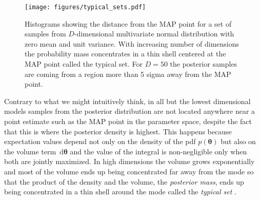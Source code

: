 \documentclass[12pt,dvipsnames]{report}
\newcommand{\ud}{\,\mathrm{d}}
\renewcommand{\vec}[1]{\boldsymbol{\mathbf{#1}}}
\begin{document}
%
\begin{figure}[t]
    \begin{centering}
        \texttt{[image: figures/typical\_sets.pdf]}
        \caption{Histograms showing the distance from the MAP point for a set of 
        samples from $D$-dimensional multivariate normal distribution with 
        zero mean and unit variance. With increasing number of dimensions the 
        probability mass concentrates in a thin shell centered at the MAP point 
        called the typical set. For $D=50$ the posterior samples are coming from 
        a region more than 5 sigma away from the MAP point.}     
               \label{fig:typical_sets}
    \end{centering}
\end{figure}
Contrary to what we might intuitively think, in all but the lowest dimensional models
samples from the posterior distribution are not located anywhere 
near a point estimate such as the MAP point in the parameter space, despite the fact 
that this is where the posterior density is highest.
This happens because expectation values  depend not only on the density of the pdf 
$p(\vec\theta)$ but also on the volume term 
$\ud \vec\theta$ and the value of the integral is non-negligible only when both are 
jointly maximized. In high dimensions the volume grows exponentially and most 
of the volume ends up being concentrated far away from the mode so that 
the product of the density and the  volume, the \textsl{posterior mass}, ends up 
being concentrated in a thin shell around the mode called the \textsl{typical set} 
\citep[for a good overview of this issue see][]{arXiv:1701.02434}.
\end{document}
